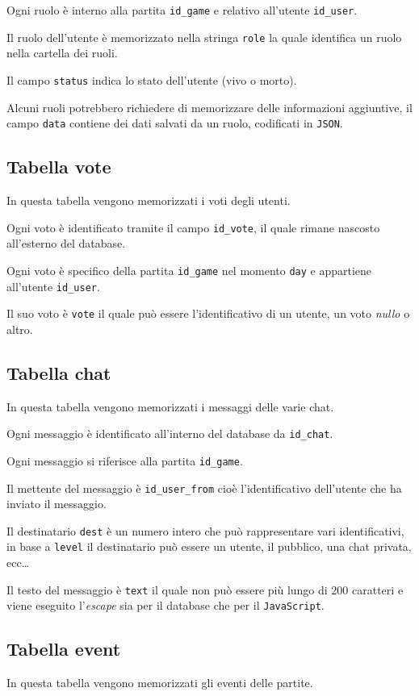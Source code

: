 \documentclass[10pt,a4paper]{article}
\newcommand{\lang}[1]{\texttt{#1}}
\begin{document}
Ogni ruolo è interno alla partita \texttt{id\_game} e relativo all'utente \texttt{id\_user}. 

Il ruolo dell'utente è memorizzato nella stringa \texttt{role} la quale identifica un ruolo nella cartella dei ruoli. 

Il campo \texttt{status} indica lo stato dell'utente (vivo o morto). 

Alcuni ruoli potrebbero richiedere di memorizzare delle informazioni aggiuntive, il campo \texttt{data} contiene dei dati salvati da un ruolo, codificati in \texttt{JSON}.

\subsection{Tabella vote}
In questa tabella vengono memorizzati i voti degli utenti. 

Ogni voto è identificato tramite il campo \texttt{id\_vote}, il quale rimane nascosto all'esterno del database. 

Ogni voto è specifico della partita \texttt{id\_game} nel momento \texttt{day} e appartiene all'utente \texttt{id\_user}. 

Il suo voto è \texttt{vote} il quale può essere l'identificativo di un utente, un voto \emph{nullo} o altro. 

\subsection{Tabella chat}
In questa tabella vengono memorizzati i messaggi delle varie chat. 

Ogni messaggio è identificato all'interno del database da \texttt{id\_chat}. 

Ogni messaggio si riferisce alla partita \texttt{id\_game}. 

Il mettente del messaggio è \texttt{id\_user\_from} cioè l'identificativo dell'utente che ha inviato il messaggio. 

Il destinatario \texttt{dest} è un numero intero che può rappresentare vari identificativi, in base a \texttt{level} il destinatario può essere un utente, il pubblico, una chat privata, ecc\dots

Il testo del messaggio è \texttt{text} il quale non può essere più lungo di 200 caratteri e viene eseguito l'\emph{escape} sia per il database che per il \lang{JavaScript}.

\subsection{Tabella event}
In questa tabella vengono memorizzati gli eventi delle partite. 
\end{document}
